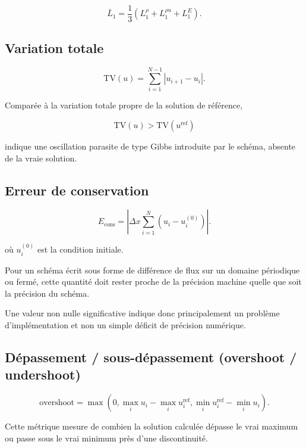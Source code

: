 \documentclass[11pt]{article}
\begin{document}
\[
\bar L_1
=
\frac{1}{3}
\left(
L_1^\rho
+
L_1^{\rho u}
+
L_1^E
\right).
\]


\subsection{Variation totale}

\begin{equation}
\mathrm{TV}(u)
=
\sum_{i=1}^{N-1}
|u_{i+1}-u_i|.
\end{equation}

Comparée à la variation totale propre de la solution de référence,

\[
\mathrm{TV}(u) >
\mathrm{TV}(u^{\text{ref}})
\]

indique une oscillation parasite de type Gibbs introduite par le schéma,
absente de la vraie solution.


\subsection{Erreur de conservation}

\begin{equation}
E_{\text{cons}}
=
\left|
\Delta x
\sum_{i=1}^{N}
\left(
u_i-u_i^{(0)}
\right)
\right|.
\end{equation}

où $u_i^{(0)}$ est la condition initiale.

Pour un schéma écrit sous forme de différence de flux sur un domaine
périodique ou fermé, cette quantité doit rester proche de la précision
machine quelle que soit la précision du schéma.

Une valeur non nulle significative indique donc principalement un
problème d'implémentation et non un simple déficit de précision numérique.


\subsection{Dépassement / sous-dépassement
(overshoot / undershoot)}

\begin{equation}
\text{overshoot}
=
\max
\left(
0,
\max_i u_i-\max_i u_i^{\text{ref}},
\min_i u_i^{\text{ref}}-\min_i u_i
\right).
\end{equation}

Cette métrique mesure de combien la solution calculée dépasse le vrai
maximum ou passe sous le vrai minimum près d'une discontinuité.
\end{document}
